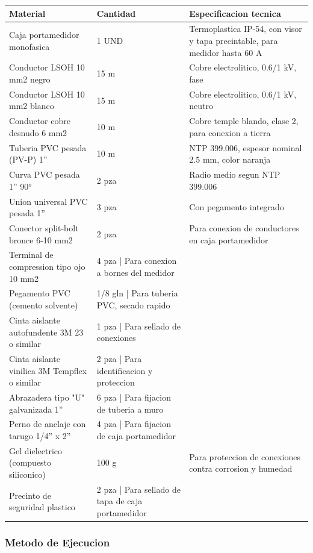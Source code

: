 \begin{longtable}{L{5.5cm} L{2.5cm} L{6.5cm}}
\toprule
\textbf{Material} & \textbf{Cantidad} & \textbf{Especificacion tecnica} \\
\midrule
Caja portamedidor monofasica & 1 UND & Termoplastica IP-54, con visor y tapa precintable, para medidor hasta 60 A \\
Conductor LSOH 10 mm2 negro & 15 m & Cobre electrolitico, 0.6/1 kV, fase \\
Conductor LSOH 10 mm2 blanco & 15 m & Cobre electrolitico, 0.6/1 kV, neutro \\
Conductor cobre desnudo 6 mm2 & 10 m & Cobre temple blando, clase 2, para conexion a tierra \\
Tuberia PVC pesada (PV-P) 1'' & 10 m & NTP 399.006, espesor nominal 2.5 mm, color naranja \\
Curva PVC pesada 1'' 90° & 2 pza & Radio medio segun NTP 399.006 \\
Union universal PVC pesada 1'' & 3 pza & Con pegamento integrado \\
Conector split-bolt bronce 6-10 mm2 & 2 pza & Para conexion de conductores en caja portamedidor \\
Terminal de compression tipo ojo 10 mm2 & 4 pza | Para conexion a bornes del medidor \\
Pegamento PVC (cemento solvente) & 1/8 gln | Para tuberia PVC, secado rapido \\
Cinta aislante autofundente 3M 23 o similar & 1 pza | Para sellado de conexiones \\
Cinta aislante vinilica 3M Tempflex o similar & 2 pza | Para identificacion y proteccion \\
Abrazadera tipo "U" galvanizada 1'' & 6 pza | Para fijacion de tuberia a muro \\
Perno de anclaje con tarugo 1/4'' x 2'' & 4 pza | Para fijacion de caja portamedidor \\
Gel dielectrico (compuesto siliconico) & 100 g & Para proteccion de conexiones contra corrosion y humedad \\
Precinto de seguridad plastico & 2 pza | Para sellado de tapa de caja portamedidor \\
\bottomrule
\end{longtable}

\subsubsection{Metodo de Ejecucion}

